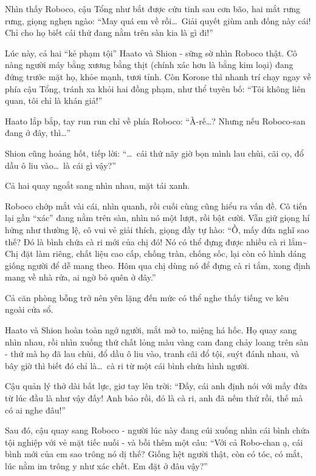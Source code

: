 \documentclass[../main.tex]{subfiles}
\begin{document}
Nhìn thấy Roboco, cậu Tổng như bắt được cứu tinh sau cơn bão, hai mắt rưng rưng, giọng nghẹn ngào: ``May quá em về rồi\dots\ Giải quyết giùm anh đống này cái! Chỉ cho họ biết cái thứ đang nằm trên sàn kia là gì đi!''

Lúc này, cả hai ``kẻ phạm tội''  Haato và Shion - sững sờ nhìn Roboco thật. Cô nàng người máy bằng xương bằng thịt (chính xác hơn là bằng kim loại) đang đứng trước mặt họ, khỏe mạnh, tươi tỉnh. Còn Korone thì nhanh trí chạy ngay về phía cậu Tổng, tránh xa khỏi hai đồng phạm, như thể tuyên bố: ``Tôi không liên quan, tôi chỉ là khán giả!''

Haato lắp bắp, tay run run chỉ về phía Roboco: ``À-rế\dots? Nhưng nếu Roboco-san đang ở đây, thì\dots''

Shion cũng hoảng hốt, tiếp lời: ``\dots\ cái thứ nãy giờ bọn mình lau chùi, cãi cọ, đổ dầu ô liu vào\dots\ là cái gì vậy?''

Cả hai quay ngoắt sang nhìn nhau, mặt tái xanh.

Roboco chớp mắt vài cái, nhìn quanh, rồi cuối cùng cũng hiểu ra vấn đề. Cô tiến lại gần ``xác'' đang nằm trên sàn, nhìn nó một lượt, rồi bật cười. Vẫn giữ giọng hí hửng như thường lệ, cô vui vẻ giải thích, giọng đầy tự hào: ``Ồ, mấy đứa nghĩ sao thế? Đó là bình chứa cà ri mới của chị đó! Nó có thể đựng được nhiều cà ri lắm\~{} Chị đặt làm riêng, chất liệu cao cấp, chống tràn, chống sốc, lại còn có hình dáng giống người để dễ mang theo. Hôm qua chị dùng nó để đựng cà ri tắm, xong định mang về nhà rửa, ai ngờ bỏ quên ở đây.''

Cả căn phòng bỗng trở nên yên lặng đến mức có thể nghe thấy tiếng ve kêu ngoài cửa sổ.

Haato và Shion hoàn toàn ngớ người, mắt mở to, miệng há hốc. Họ quay sang nhìn nhau, rồi nhìn xuống thứ chất lỏng màu vàng cam đang chảy loang trên sàn - thứ mà họ đã lau chùi, đổ dầu ô liu vào, tranh cãi đổ tội, suýt đánh nhau, và bây giờ thì biết đó chỉ là\dots\ cà ri từ một cái bình chứa hình người.

Cậu quản lý thở dài bất lực, giơ tay lên trời: ``Đấy, cái anh định nói với mấy đứa từ lúc đầu là như vậy đấy! Anh bảo rồi, đó là cà ri, anh đã nếm thử rồi, thế mà có ai nghe đâu!''

Sau đó, cậu quay sang Roboco - người lúc này đang cúi xuống nhìn cái bình chứa tội nghiệp với vẻ mặt tiếc nuối - và bồi thêm một câu: ``Với cả Robo-chan ạ, cái bình mới của em sao trông nó dị thế? Giống hệt người thật, còn có tóc, có mắt, lúc nằm im trông y như xác chết. Em đặt ở đâu vậy?''
\end{document}
